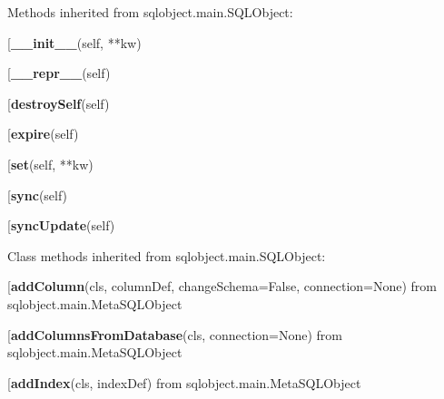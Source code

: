 Methods inherited from sqlobject.main.SQLObject:\\
\begin{description}\item[{\bf \_\_init\_\_}(self, **kw)\end{description}

\begin{description}\item[{\bf \_\_repr\_\_}(self)\end{description}

\begin{description}\item[{\bf destroySelf}(self)\end{description}

\begin{description}\item[{\bf expire}(self)\end{description}

\begin{description}\item[{\bf set}(self, **kw)\end{description}

\begin{description}\item[{\bf sync}(self)\end{description}

\begin{description}\item[{\bf syncUpdate}(self)\end{description}


Class methods inherited from sqlobject.main.SQLObject:\\
\begin{description}\item[{\bf addColumn}(cls, columnDef, changeSchema=False, connection=None) from sqlobject.main.MetaSQLObject\end{description}

\begin{description}\item[{\bf addColumnsFromDatabase}(cls, connection=None) from sqlobject.main.MetaSQLObject\end{description}

\begin{description}\item[{\bf addIndex}(cls, indexDef) from sqlobject.main.MetaSQLObject\end{description}

